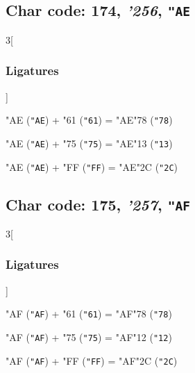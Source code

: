 \documentclass{article}
\newlength{\maxcharwidth}
\begin{document}
\subsection{Char code: 174, {\it'256}, {\tt"AE}}
\label{char_174}


\begin{multicols}{3}[\subsubsection{Ligatures}]

{\testfont\char"AE\noboundary} ({\tt"AE}) + {\testfont\char"61\noboundary} ({\tt"61}) = {\testfont\char"AE\noboundary}{\testfont\char"78\noboundary} ({\tt"78}) 

{\testfont\char"AE\noboundary} ({\tt"AE}) + {\testfont\char"75\noboundary} ({\tt"75}) = {\testfont\char"AE\noboundary}{\testfont\char"13\noboundary} ({\tt"13}) 

{\testfont\char"AE\noboundary} ({\tt"AE}) + {\testfont\char"FF\noboundary} ({\tt"FF}) = {\testfont\char"AE\noboundary}{\testfont\char"2C\noboundary} ({\tt"2C}) 

\end{multicols}

\subsection{Char code: 175, {\it'257}, {\tt"AF}}
\label{char_175}


\begin{multicols}{3}[\subsubsection{Ligatures}]

{\testfont\char"AF\noboundary} ({\tt"AF}) + {\testfont\char"61\noboundary} ({\tt"61}) = {\testfont\char"AF\noboundary}{\testfont\char"78\noboundary} ({\tt"78}) 

{\testfont\char"AF\noboundary} ({\tt"AF}) + {\testfont\char"75\noboundary} ({\tt"75}) = {\testfont\char"AF\noboundary}{\testfont\char"12\noboundary} ({\tt"12}) 

{\testfont\char"AF\noboundary} ({\tt"AF}) + {\testfont\char"FF\noboundary} ({\tt"FF}) = {\testfont\char"AF\noboundary}{\testfont\char"2C\noboundary} ({\tt"2C}) 

\end{multicols}
\end{document}
